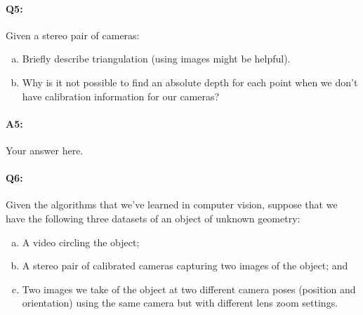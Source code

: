 \begin{enumerate}[(a)]



\pagebreak
\paragraph{Q5:} Given a stereo pair of cameras:
\begin{enumerate} [(a)]
\item Briefly describe triangulation (using images might be helpful).
\item Why is it not possible to find an absolute depth for each point when we don't have calibration information for our cameras?
\end{enumerate}

\end{enumerate}

\paragraph{A5:} Your answer here.






\pagebreak
\paragraph{Q6:}
Given the algorithms that we've learned in computer vision, suppose that we have the following three datasets of an object of unknown geometry:

\begin{enumerate}[(a)]
\item A video circling the object;
\item A stereo pair of calibrated cameras capturing two images of the object; and
\item Two images we take of the object at two different camera poses (position and orientation) using the same camera but with different lens zoom settings.
\end{enumerate}

